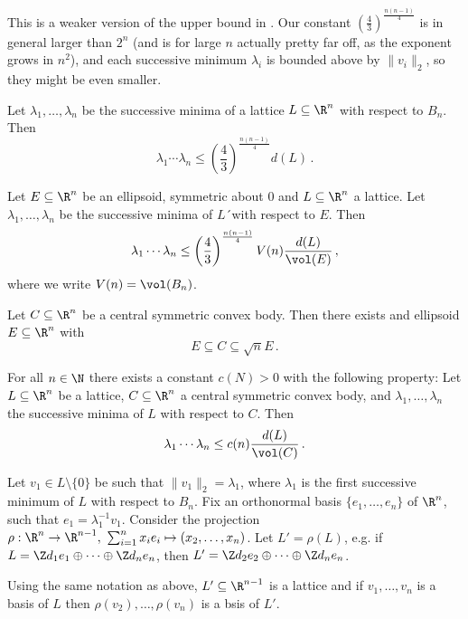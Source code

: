 \begin{rem*}
	This is a weaker version of the upper bound in .
	Our constant \( \left(\frac{4}{3}\right)^{\frac{n(n-1)}{4}} \) is in general larger than \( 2^n \) (and is for large \( n \) actually pretty far off, as the exponent grows in \( n^2 \)), and each successive minimum \( \lambda_i \) is bounded above by \( \| v_i \|_2 \), so they might be even smaller.
\end{rem*}

\begin{cor}
	Let \( \lambda_1, \dotsc, \lambda_n \) be the successive minima of a lattice \( L \subseteq \R^n \) with respect to \( B_n \).
	Then
	\[ \lambda_1 \dotsm \lambda_n \leq \left( \frac{4}{3} \right)^{\frac{n(n-1)}{4}} d(L) \,. \]
\end{cor}

\begin{cor}
	Let \( E \subseteq \R^n \) be an ellipsoid, symmetric about 0 and \( L \subseteq \R^n \) a lattice.
	Let \( \lambda_1, \dotsc, \lambda_n \) be the successive minima of \( L \)´with respect to \( E \).
	Then
	\[ \lambda_1 \dotsm \lambda_n \leq \left( \frac{4}{3} \right)^\frac{n(n-1)}{4} V(n) \frac{d(L)}{\vol(E)} \,, \]
	where we write \( V(n) = \vol(B_n) \).
\end{cor}

\begin{thm*}
	Let \( C \subseteq \R^n \) be a central symmetric convex body.
	Then there exists and ellipsoid \( E \subseteq \R^n \) with
	\[ E \subseteq C \subseteq \sqrt{n} E \,. \]
\end{thm*}

\begin{cor}
	For all \( n \in \N \) there exists a constant \( c(N) > 0 \) with the following property:
	Let \( L \subseteq \R^n \) be a lattice, \( C \subseteq \R^n \) a central symmetric convex body, and \( \lambda_1, \dotsc, \lambda_n \) the successive minima of \( L \) with respect to \( C \).
	Then
	\[ \lambda_1 \dotsm \lambda_n \leq c(n) \frac{d(L)}{\vol(C)}\, . \]
\end{cor}

Let \( v_1 \in L \setminus \{0\} \) be such that \( \|v_1\|_2 = \lambda_1 \), where \( \lambda_1 \) is the first successive minimum of \( L \) with respect to \( B_n \).
Fix an orthonormal basis \( \{e_1, \dotsc, e_n\} \) of \( \R^n \), such that \( e_1 = \lambda_1^{-1} v_1 \).
Consider the projection \( \rho: \R^n \to \R^{n-1},\ \sum_{i=1}^{n} x_i e_i \mapsto (x_2, \dotsc, x_n) \).
Let \( L' = \rho(L) \), e.g. if \( L = \Z d_1 e_1 \oplus \dots \oplus \Z d_n e_n \), then \( L' = \Z d_2 e_2 \oplus \dots \oplus \Z d_n e_n \).

\begin{lem}
	Using the same notation as above, \( L' \subseteq \R^{n-1} \) is a lattice and if \( v_1, \dotsc, v_n \) is a basis of \( L \) then \( \rho(v_2), \dotsc, \rho(v_n) \) is a bsis of \( L' \).
\end{lem}